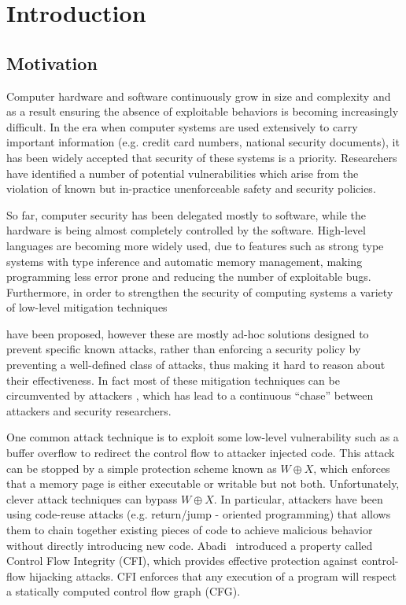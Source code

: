 \chapter{Introduction}\label{ch:introduction}

\section{Motivation}\label{sec:motivation}

Computer hardware and software continuously grow in size and complexity and as a
result ensuring the absence of exploitable behaviors is becoming increasingly 
difficult. In the era when computer systems are used extensively to
carry important information (e.g. credit card numbers, national security
documents), it has been widely accepted that security of these systems is a
priority. Researchers have identified a number of potential vulnerabilities
which arise from the violation of known but in-practice unenforceable safety
and security policies.
 
So far, computer security has been delegated mostly to software, while
the hardware is being almost completely controlled by the software.
High-level languages are becoming more widely used, due to features
such as strong type systems with type inference and automatic memory
management, making programming less error prone and reducing the
number of exploitable bugs. Furthermore, in order to strengthen the
security of computing systems a variety of low-level mitigation
techniques \cite{Cowan:1998:SAA:1267549.1267554,PaX,
  Erlingsson:2007:LSS:1793914.1793919}

have been proposed, however these are mostly ad-hoc solutions designed
to prevent specific known attacks, rather than enforcing a security
policy by preventing a well-defined class of attacks, thus making it
hard to reason about their effectiveness. In fact most of these
mitigation techniques can be circumvented by attackers
\cite{Szekeres2013}, which has lead to a continuous ``chase'' between
attackers and security researchers.

One common attack technique is to exploit some low-level vulnerability
such as a buffer overflow to redirect the control flow to attacker
injected code. This attack can be stopped by a simple protection
scheme known as $W \oplus X$, which enforces that a memory page is
either executable or writable but not both.  Unfortunately, clever
attack techniques can bypass $W \oplus X$. In particular, attackers
have been using code-reuse attacks (e.g. return/jump - oriented
programming) that allows them to chain together existing pieces of
code to achieve malicious behavior without directly introducing new
code.  Abadi~\ETAL\cite{abadi2005} introduced a property called
Control Flow Integrity (CFI), which provides effective protection
against control-flow hijacking attacks.  CFI enforces that any
execution of a program will respect a statically computed control flow
graph (CFG).  

